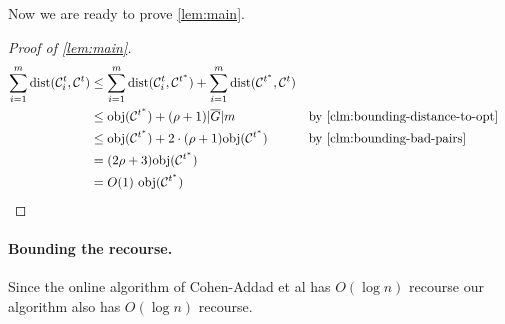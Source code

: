 Now we are ready to prove \cref{lem:main}.

\begin{proof}[Proof of \cref{lem:main}]
    \begin{align}
        \sum_{i = 1}^m \dist(\m{C}_i^t, \m{C}^t) &\leq \sum_{i = 1}^m \dist(\m{C}_i^t, \m{C}^{t^*}) + \sum_{i = 1}^m \dist(\m{C}^{t^*}, \m{C}^{t}) \n \\
        &\leq \opt + (\rho + 1)|\overline{G}|m && \text{by \cref{clm:bounding-distance-to-opt}} \n \\
        &\leq \opt + 2 \cdot (\rho + 1) \opt && \text{by \cref{clm:bounding-bad-pairs}} \n \\
        &= (2\rho + 3) \opt \n \\
        &= \appr \, \, \opt \n
    \end{align}
\end{proof}

\paragraph{Bounding the recourse.} Since the online algorithm of Cohen-Addad et al \cite{cohen2022online} has $O(\log n)$ recourse our algorithm also has $O(\log n)$ recourse.
